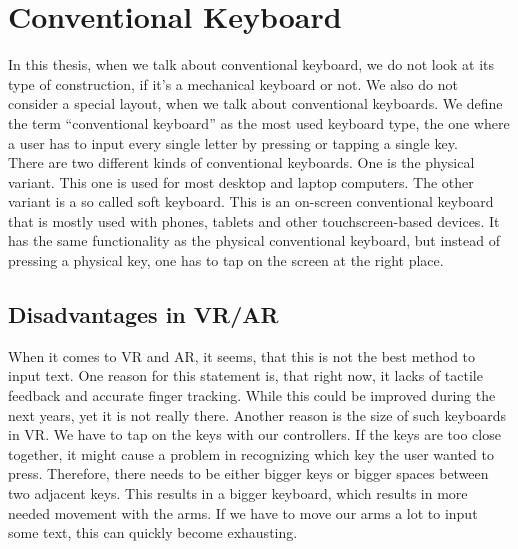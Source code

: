 \section{Conventional Keyboard}
In this thesis, when we talk about conventional keyboard, we do not look at its type of construction, if it's a mechanical keyboard or not. We also do not consider a special layout, when we talk about conventional keyboards. We define the term ``conventional keyboard'' as the most used keyboard type, the one where a user has to input every single letter by pressing or tapping a single key.\\
There are two different kinds of conventional keyboards. One is the physical variant. This one is used for most desktop and laptop computers. The other variant is a so called soft keyboard. This is an on-screen conventional keyboard that is mostly used with phones, tablets and other touchscreen-based devices. It has the same functionality as the physical conventional keyboard, but instead of pressing a physical key, one has to tap on the screen at the right place.\\

\subsection{Disadvantages in VR/AR}
When it comes to VR and AR, it seems, that this is not the best method to input text. One reason for this statement is, that right now, it lacks of tactile feedback and accurate finger tracking. While this could be improved during the next years, yet it is not really there. Another reason is the size of such keyboards in VR. We have to tap on the keys with our controllers. If the keys are too close together, it might cause a problem in recognizing which key the user wanted to press. Therefore, there needs to be either bigger keys or bigger spaces between two adjacent keys. This results in a bigger keyboard, which results in more needed movement with the arms. If we have to move our arms a lot to input some text, this can quickly become exhausting.

